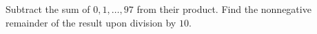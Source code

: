 Subtract the sum of $0,1,\ldots,97$ from their product. Find the nonnegative remainder of the result upon division by $10$.
